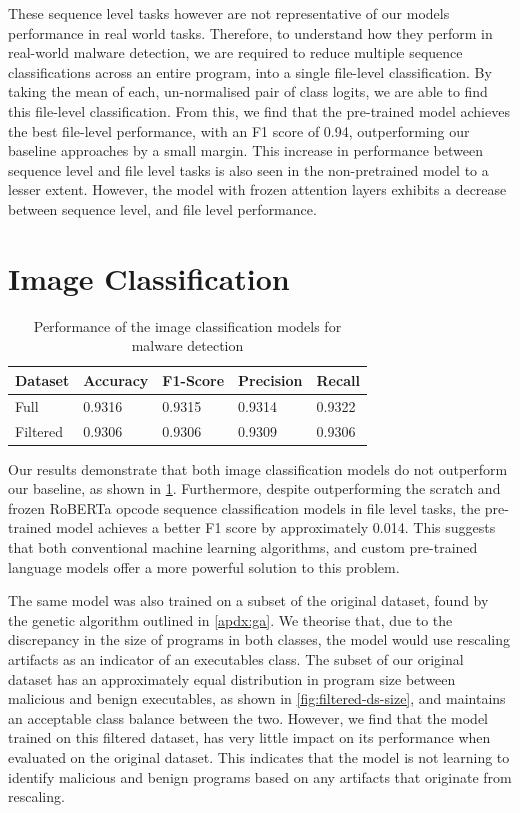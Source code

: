 \documentclass[main.tex]{subfiles}
\begin{document}
These sequence level tasks however are not representative of our models performance in real world tasks. Therefore, to understand how they perform in real-world malware detection, we are required to reduce multiple sequence classifications across an entire program, into a single file-level classification. By taking the mean of each, un-normalised pair of class logits, we are able to find this file-level classification. From this, we find that the pre-trained model achieves the best file-level performance, with an F1 score of 0.94, outperforming our baseline approaches by a small margin. This increase in performance between sequence level and file level tasks is also seen in the non-pretrained model to a lesser extent. However, the model with frozen attention layers exhibits a decrease between sequence level, and file level performance.


\section{Image Classification}

\begin{table}[h]
    \centering
    \caption{Performance of the image classification models for malware detection}
    \begin{tabular}{@{}lllll@{}}
        \toprule
        \textbf{Dataset} & \textbf{Accuracy} & \textbf{F1-Score} & \textbf{Precision} & \textbf{Recall} \\ \midrule
        Full & 0.9316 & 0.9315 & 0.9314 & 0.9322 \\
        Filtered & 0.9306 & 0.9306 & 0.9309 & 0.9306 \\ \bottomrule
    \end{tabular}
    \label{tab:image-classifier-model-results}
\end{table}

\noindent
Our results demonstrate that both image classification models do not outperform our baseline, as shown in \cref{tab:image-classifier-model-results}. Furthermore, despite outperforming the scratch and frozen RoBERTa opcode sequence classification models in file level tasks, the pre-trained model achieves a better F1 score by approximately 0.014. This suggests that both conventional machine learning algorithms, and custom pre-trained language models offer a more powerful solution to this problem.

The same model was also trained on a subset of the original dataset, found by the genetic algorithm outlined in \cref{apdx:ga}. We theorise that, due to the discrepancy in the size of programs in both classes, the model would use rescaling artifacts as an indicator of an executables class. The subset of our original dataset has an approximately equal distribution in program size between malicious and benign executables, as shown in \cref{fig:filtered-ds-size}, and maintains an acceptable class balance between the two. However, we find that the model trained on this filtered dataset, has very little impact on its performance when evaluated on the original dataset. This indicates that the model is not learning to identify malicious and benign programs based on any artifacts that originate from rescaling.  
\end{document}

